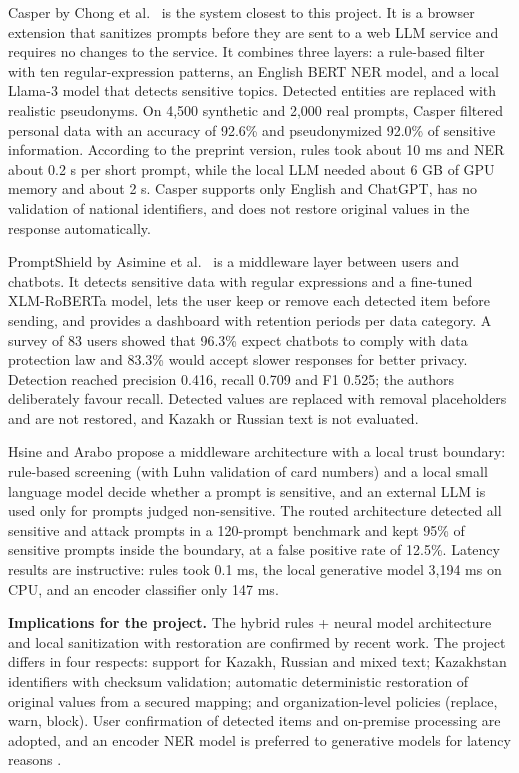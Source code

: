 \documentclass[12pt,a4paper]{article}
\begin{document}
Casper by Chong et al.~\cite{r11} is the system closest to this project. It is a browser extension that sanitizes prompts before they are sent to a web LLM service and requires no changes to the service. It combines three layers: a rule-based filter with ten regular-expression patterns, an English BERT NER model, and a local Llama-3 model that detects sensitive topics. Detected entities are replaced with realistic pseudonyms. On 4,500 synthetic and 2,000 real prompts, Casper filtered personal data with an accuracy of 92.6\% and pseudonymized 92.0\% of sensitive information. According to the preprint version, rules took about 10 ms and NER about 0.2 s per short prompt, while the local LLM needed about 6 GB of GPU memory and about 2 s. Casper supports only English and ChatGPT, has no validation of national identifiers, and does not restore original values in the response automatically.

PromptShield by Asimine et al.~\cite{r12} is a middleware layer between users and chatbots. It detects sensitive data with regular expressions and a fine-tuned XLM-RoBERTa model, lets the user keep or remove each detected item before sending, and provides a dashboard with retention periods per data category. A survey of 83 users showed that 96.3\% expect chatbots to comply with data protection law and 83.3\% would accept slower responses for better privacy. Detection reached precision 0.416, recall 0.709 and F1 0.525; the authors deliberately favour recall. Detected values are replaced with removal placeholders and are not restored, and Kazakh or Russian text is not evaluated.

Hsine and Arabo \cite{r13} propose a middleware architecture with a local trust boundary: rule-based screening (with Luhn validation of card numbers) and a local small language model decide whether a prompt is sensitive, and an external LLM is used only for prompts judged non-sensitive. The routed architecture detected all sensitive and attack prompts in a 120-prompt benchmark and kept 95\% of sensitive prompts inside the boundary, at a false positive rate of 12.5\%. Latency results are instructive: rules took 0.1 ms, the local generative model 3,194 ms on CPU, and an encoder classifier only 147 ms.

\textbf{Implications for the project.} The hybrid rules + neural model architecture \cite{r11,r12,r13} and local sanitization with restoration \cite{r10} are confirmed by recent work. The project differs in four respects: support for Kazakh, Russian and mixed text; Kazakhstan identifiers with checksum validation; automatic deterministic restoration of original values from a secured mapping; and organization-level policies (replace, warn, block). User confirmation of detected items \cite{r12} and on-premise processing \cite{r13} are adopted, and an encoder NER model is preferred to generative models for latency reasons \cite{r11,r13}.
\end{document}
